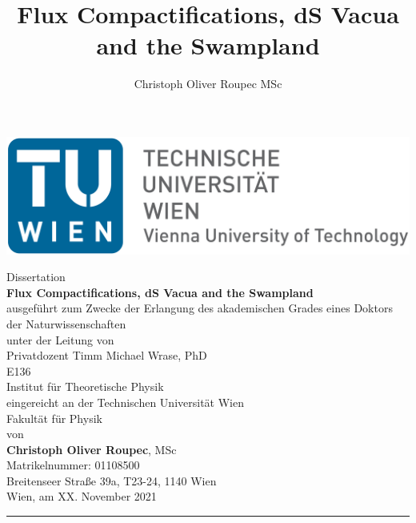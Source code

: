 \documentclass[a4paper,12pt]{report}
\title{Flux Compactifications, dS Vacua and the Swampland}
\author{Christoph Oliver Roupec MSc}
\begin{document}
\pagestyle{myplain}
\setlength{\parindent}{0pt}
\renewcommand{\arraystretch}{1.2} %


\setcounter{page}{0}

{\thispagestyle{empty}
\includegraphics[scale=0.08]{TU_Logo.png}
\vspace{12pt}
\begin{center}
{\large
Dissertation\vspace{12pt}\\
{\Large\textbf{Flux Compactifications, dS Vacua and the Swampland}}\vspace{12pt}\\
ausgeführt zum Zwecke der Erlangung des akademischen Grades eines Doktors der Naturwissenschaften\vspace{12pt}\\
unter der Leitung von\vspace{12pt}\\
Privatdozent Timm Michael Wrase, PhD\\
E136\\
Institut für Theoretische Physik\vspace{12pt}\\
eingereicht an der Technischen Universität Wien\\
Fakultät für Physik\vspace{12pt}\\
von\vspace{12pt}\\
{\Large\textbf{Christoph Oliver Roupec}, MSc}\\
Matrikelnummer: 01108500\vspace{12pt}\\
Breitenseer Straße 39a, T23-24, 1140 Wien\vspace{90pt}\\
Wien, am XX. November 2021 \hspace{\fill}\rule{0.33 \textwidth}{0.5pt}
}
\end{center}
}
\end{document}
